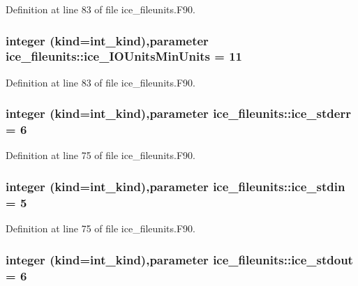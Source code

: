 Definition at line 83 of file ice\_\-fileunits.F90.\hypertarget{namespaceice__fileunits_a4398f02a1fc60cb19a367c3c398c3912}{
\subsubsection[{ice\_\-IOUnitsMinUnits}]{\setlength{\rightskip}{0pt plus 5cm}integer (kind=int\_\-kind),parameter {\bf ice\_\-fileunits::ice\_\-IOUnitsMinUnits} = 11}}
\label{namespaceice__fileunits_a4398f02a1fc60cb19a367c3c398c3912}


Definition at line 83 of file ice\_\-fileunits.F90.\hypertarget{namespaceice__fileunits_aa45e19d657680ed407b944234295c499}{
\subsubsection[{ice\_\-stderr}]{\setlength{\rightskip}{0pt plus 5cm}integer (kind=int\_\-kind),parameter {\bf ice\_\-fileunits::ice\_\-stderr} = 6}}
\label{namespaceice__fileunits_aa45e19d657680ed407b944234295c499}


Definition at line 75 of file ice\_\-fileunits.F90.\hypertarget{namespaceice__fileunits_ad61888d9e876b102bb3e1c2b6653eadc}{
\subsubsection[{ice\_\-stdin}]{\setlength{\rightskip}{0pt plus 5cm}integer (kind=int\_\-kind),parameter {\bf ice\_\-fileunits::ice\_\-stdin} = 5}}
\label{namespaceice__fileunits_ad61888d9e876b102bb3e1c2b6653eadc}


Definition at line 75 of file ice\_\-fileunits.F90.\hypertarget{namespaceice__fileunits_a36939520ad7720151c3579da581946e7}{
\subsubsection[{ice\_\-stdout}]{\setlength{\rightskip}{0pt plus 5cm}integer (kind=int\_\-kind),parameter {\bf ice\_\-fileunits::ice\_\-stdout} = 6}}
\label{namespaceice__fileunits_a36939520ad7720151c3579da581946e7}


